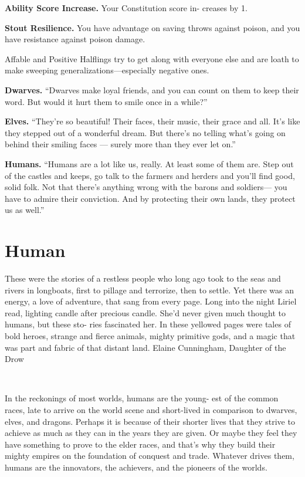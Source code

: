 \textbf{Ability Score Increase.} Your Constitution score in- creases by 1.

\textbf{Stout Resilience.} You have advantage on saving throws against poison, and you have resistance against poison damage.

\begin{DndSidebar}[float=!t]{Affable and Positive}
Halflings try to get along with everyone else and are loath to make sweeping generalizations—especially negative ones.

\textbf{Dwarves.} ``Dwarves make loyal friends, and you can count on them to keep their word. But would it hurt them to smile once in a while?''

\textbf{Elves.} ``They’re so beautiful! Their faces, their music, their grace and all. It’s like they stepped out of a wonderful dream. But there’s no telling what’s going on behind their smiling faces — surely more than they ever let on.''

\textbf{Humans.} ``Humans are a lot like us, really. At least some of them are. Step out of the castles and keeps, go talk to the farmers and herders and you’ll find good, solid folk. Not that there’s anything wrong with the barons and soldiers— you have to admire their conviction. And by protecting their own lands, they protect us as well.''
\end{DndSidebar}

\section{Human}
\DndQuote%
  {These were the stories of a restless people who}
  {long ago took to the seas and rivers in longboats, first to pillage and terrorize, then to settle. Yet there was an energy, a love of adventure, that sang from every page. Long into the night Liriel read, lighting candle after precious candle. \newline\indent She’d never given much thought to humans, but these sto- ries fascinated her. In these yellowed pages were tales of bold heroes, strange and fierce animals, mighty primitive gods, and a magic that was part and fabric of that distant land.}
  {Elaine Cunningham, Daughter of the Drow}

\ \newline
\par\noindent In the reckonings of most worlds, humans are the young- est of the common races, late to arrive on the world scene and short-lived in comparison to dwarves, elves, and dragons. Perhaps it is because of their shorter lives that they strive to achieve as much as they can in the years they are given. Or maybe they feel they have something to prove to the elder races, and that’s why they build their mighty empires on the foundation of conquest and trade. Whatever drives them, humans are the innovators, the achievers, and the pioneers of the worlds.


